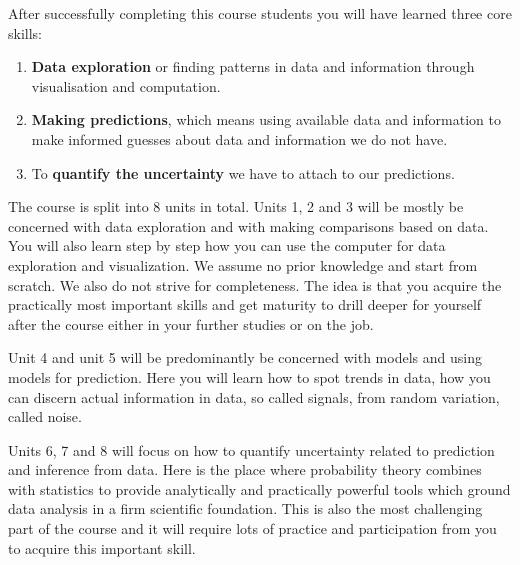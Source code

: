 \documentclass[
  letterpaper,
]{scrbook}
\begin{document}
\begin{tcolorbox}[enhanced jigsaw, toprule=.15mm, colbacktitle=quarto-callout-important-color!10!white, breakable, coltitle=black, rightrule=.15mm, bottomtitle=1mm, bottomrule=.15mm, titlerule=0mm, title=\textcolor{quarto-callout-important-color}{\faExclamation}\hspace{0.5em}{The three basic skills you will learn in this course}, arc=.35mm, leftrule=.75mm, toptitle=1mm, left=2mm, opacityback=0, opacitybacktitle=0.6, colframe=quarto-callout-important-color-frame, colback=white]

After successfully completing this course students you will have learned
three core skills:

\begin{enumerate}
\def\labelenumi{\arabic{enumi}.}
\item
  \textbf{Data exploration} or finding patterns in data and information
  through visualisation and computation.
\item
  \textbf{Making predictions}, which means using available data and
  information to make informed guesses about data and information we do
  not have.
\item
  To \textbf{quantify the uncertainty} we have to attach to our
  predictions.
\end{enumerate}

\end{tcolorbox}

The course is split into 8 units in total. Units 1, 2 and 3 will be
mostly be concerned with data exploration and with making comparisons
based on data. You will also learn step by step how you can use the
computer for data exploration and visualization. We assume no prior
knowledge and start from scratch. We also do not strive for
completeness. The idea is that you acquire the practically most
important skills and get maturity to drill deeper for yourself after the
course either in your further studies or on the job.

Unit 4 and unit 5 will be predominantly be concerned with models and
using models for prediction. Here you will learn how to spot trends in
data, how you can discern actual information in data, so called signals,
from random variation, called noise.

Units 6, 7 and 8 will focus on how to quantify uncertainty related to
prediction and inference from data. Here is the place where probability
theory combines with statistics to provide analytically and practically
powerful tools which ground data analysis in a firm scientific
foundation. This is also the most challenging part of the course and it
will require lots of practice and participation from you to acquire this
important skill.
\end{document}
